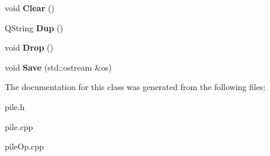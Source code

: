 \begin{DoxyCompactItemize}
\item 
\hypertarget{class_pile_affichage_a6676383310776eb66f40ff03095193a3}{void {\bfseries Clear} ()}\label{class_pile_affichage_a6676383310776eb66f40ff03095193a3}

\item 
\hypertarget{class_pile_affichage_a1fbdf1c3578bf2d3d958595f820ae831}{Q\-String {\bfseries Dup} ()}\label{class_pile_affichage_a1fbdf1c3578bf2d3d958595f820ae831}

\item 
\hypertarget{class_pile_affichage_adccff01313daf3c1c7666154549ae4ae}{void {\bfseries Drop} ()}\label{class_pile_affichage_adccff01313daf3c1c7666154549ae4ae}

\item 
\hypertarget{class_pile_affichage_a0cb7b0b675468c8670c6260c3c75d203}{void {\bfseries Save} (std\-::ostream \&os)}\label{class_pile_affichage_a0cb7b0b675468c8670c6260c3c75d203}

\end{DoxyCompactItemize}


The documentation for this class was generated from the following files\-:\begin{DoxyCompactItemize}
\item 
pile.\-h\item 
pile.\-cpp\item 
pile\-Op.\-cpp\end{DoxyCompactItemize}
